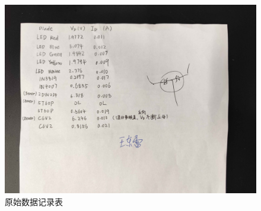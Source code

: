 \documentclass[UTF8]{article}
\begin{document}
\begin{figure}[H]\centering
    \includegraphics[width=\columnwidth]{LCE-01-二极管/assets/原始数据.jpg}
    \caption{原始数据记录表}
\end{figure}

%
\end{document}
